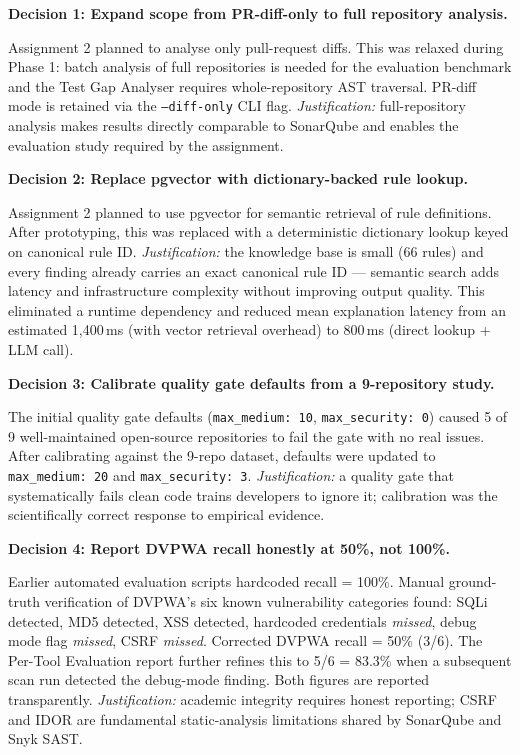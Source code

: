 \documentclass[12pt,a4paper]{article}
\begin{document}
\textbf{Decision 1: Expand scope from PR-diff-only to full repository analysis.}

Assignment 2 planned to analyse only pull-request diffs.  This was relaxed during
Phase 1: batch analysis of full repositories is needed for the evaluation benchmark
and the Test Gap Analyser requires whole-repository AST traversal.  PR-diff mode is
retained via the \texttt{--diff-only} CLI flag.  \emph{Justification:} full-repository
analysis makes results directly comparable to SonarQube and enables the evaluation
study required by the assignment.

\textbf{Decision 2: Replace pgvector with dictionary-backed rule lookup.}

Assignment 2 planned to use pgvector for semantic retrieval of rule definitions.
After prototyping, this was replaced with a deterministic dictionary lookup keyed on
canonical rule ID.  \emph{Justification:} the knowledge base is small (66 rules) and
every finding already carries an exact canonical rule ID --- semantic search adds
latency and infrastructure complexity without improving output quality.  This
eliminated a runtime dependency and reduced mean explanation latency from an estimated
1,400\,ms (with vector retrieval overhead) to 800\,ms (direct lookup + LLM call).

\textbf{Decision 3: Calibrate quality gate defaults from a 9-repository study.}

The initial quality gate defaults (\texttt{max\_medium: 10},
\texttt{max\_security: 0}) caused 5 of 9 well-maintained open-source repositories
to fail the gate with no real issues.  After calibrating against the 9-repo dataset,
defaults were updated to \texttt{max\_medium: 20} and \texttt{max\_security: 3}.
\emph{Justification:} a quality gate that systematically fails clean code trains
developers to ignore it; calibration was the scientifically correct response to
empirical evidence.

\textbf{Decision 4: Report DVPWA recall honestly at 50\%, not 100\%.}

Earlier automated evaluation scripts hardcoded recall = 100\%.  Manual ground-truth
verification of DVPWA's six known vulnerability categories found: SQLi detected,
MD5 detected, XSS detected, hardcoded credentials \emph{missed}, debug mode flag
\emph{missed}, CSRF \emph{missed}.  Corrected DVPWA recall = 50\% (3/6).
The Per-Tool Evaluation report further refines this to 5/6 = 83.3\% when a
subsequent scan run detected the debug-mode finding.  Both figures are reported
transparently.  \emph{Justification:} academic integrity requires honest reporting;
CSRF and IDOR are fundamental static-analysis limitations shared by SonarQube and
Snyk SAST.
\end{document}
